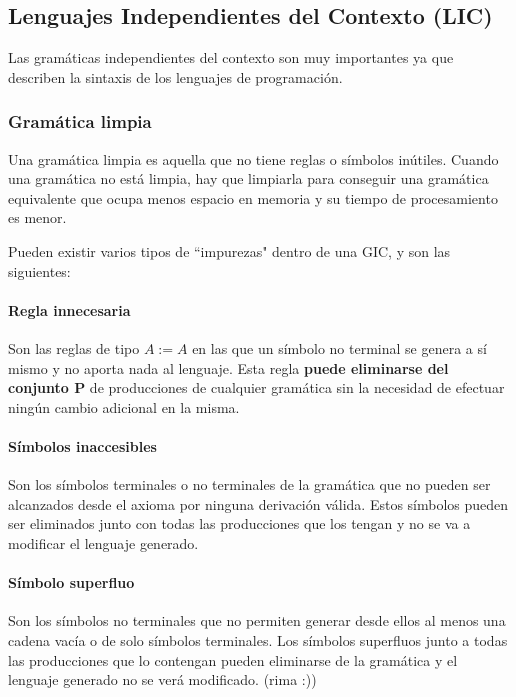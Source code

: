 \documentclass[12pt]{article}
\begin{document}
\subsection{Lenguajes Independientes del Contexto (LIC)}
Las gramáticas independientes del contexto son muy importantes ya que describen la sintaxis de los lenguajes de programación.

\subsubsection{Gramática limpia}
Una gramática limpia es aquella que no tiene reglas o símbolos inútiles. Cuando una gramática no está limpia, hay que limpiarla para conseguir una gramática equivalente que ocupa menos espacio en memoria y su tiempo de procesamiento es menor.

Pueden existir varios tipos de  ``impurezas" dentro de una GIC, y son las siguientes:

\paragraph{Regla innecesaria}\mbox{}

Son las reglas de tipo $ A:=A $ en las que un símbolo no terminal se genera a sí mismo y no aporta nada al lenguaje. Esta regla \textbf{puede eliminarse del conjunto P} de producciones de cualquier gramática sin la necesidad de efectuar ningún cambio adicional en la misma.

\paragraph{Símbolos inaccesibles}\mbox{}

Son los símbolos terminales o no terminales de la gramática que no pueden ser alcanzados desde el axioma por ninguna derivación válida. Estos símbolos pueden ser eliminados junto con todas las producciones que los tengan y no se va a modificar el lenguaje generado.

\paragraph{Símbolo superfluo}\mbox{}

Son los símbolos no terminales que no permiten generar desde ellos al menos una cadena vacía o de solo símbolos terminales. Los símbolos superfluos junto a todas las producciones que lo contengan pueden eliminarse de la gramática y el lenguaje generado no se verá modificado. (rima :))
\end{document}
